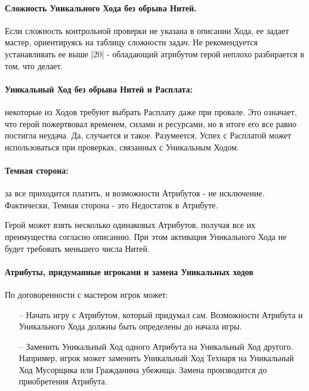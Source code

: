 \paragraph{Сложность Уникального Хода без обрыва Нитей.} Если сложность контрольной проверки не указана в описании Хода, ее задает мастер, ориентируясь на таблицу сложности задач. Не рекомендуется устанавливать ее выше |20| - обладающий атрибутом герой неплохо разбирается в том, что делает.
\paragraph{Уникальный Ход без обрыва Нитей и Расплата:} некоторые из Ходов требуют выбрать Расплату даже при провале. Это означает, что герой пожертвовал временем, силами и ресурсами, но в итоге его все равно постигла неудача. Да, случается и такое. Разумеется, Успех с Расплатой может использоваться при проверках, связанных с Уникальным Ходом.
\paragraph{Темная сторона:} за все приходится платить, и возможности Атрибутов - не исключение. Фактически, Темная сторона - это Недостаток в Атрибуте. 
\begin{tcolorbox}
Герой может взять несколько одинаковых Атрибутов, получая все их преимущества согласно описанию. При этом активация Уникального Хода не будет требовать меньшего числа Нитей.
\end{tcolorbox}
\paragraph{Атрибуты, придуманные игроками и замена Уникальных ходов}
По договоренности с мастером игрок может:
\begin{itemize}
    \item[--] Начать игру с Атрибутом, который придумал сам. Возможности Атрибута и Уникального Хода должны быть определены до начала игры.
    \item[--] Заменить Уникальный Ход одного Атрибута на Уникальный Ход другого. Например, игрок может заменить Уникальный Ход Технаря на Уникальный Ход Мусорщика или Гражданина убежища. Замена производится до приобретения Атрибута.
\end{itemize}

